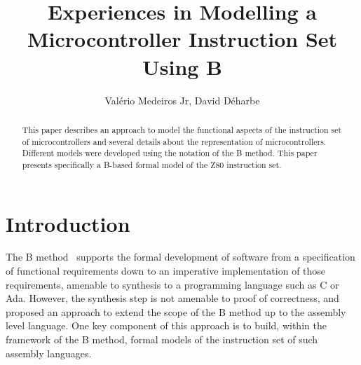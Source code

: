 \documentclass[a4paper]{llncs}
\begin{document}
\title{Experiences in Modelling a Microcontroller Instruction Set Using B}
%
%
%
%
\author{Val\'{e}rio Medeiros Jr, David D\'{e}harbe}



\maketitle


\begin{abstract}

  This paper describes an approach to model the functional aspects of
  the instruction set of microcontrollers and several details about
  the representation of microcontrollers.  Different models were
  developed using the notation of the B method. This paper presents
  specifically a B-based formal model of the Z80 instruction set.
  
\end{abstract}


%

\section{Introduction}

The B method~\cite{Abrial} supports the formal development of software
from a specification of functional requirements down to an imperative
implementation of those requirements, amenable to synthesis to a
programming language such as C or Ada. However, the synthesis step is
not amenable to proof of correctness, and~\cite{Dantas_SBMF08} proposed
an approach to extend the scope of the B method up to the assembly
level language. One key component of this approach is to build, within
the framework of the B method, formal models of the instruction set of
such assembly languages.
\end{document}
